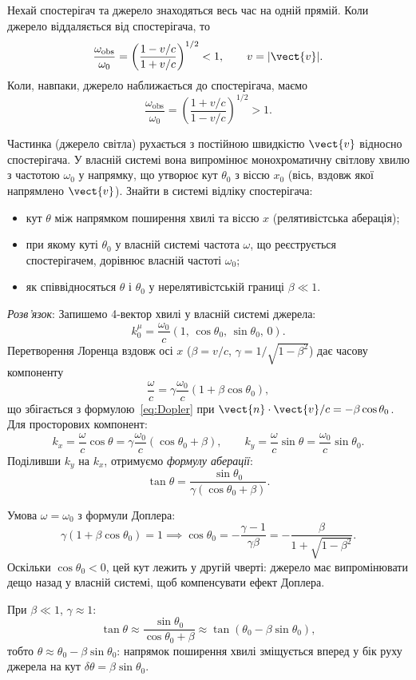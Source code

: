 Нехай спостерігач та джерело знаходяться весь час на одній прямій. Коли джерело віддаляється від спостерігача, то
\begin{equation*}
    \frac{\omega_{\text{obs}}}{\omega_0}
    = \left(\frac{1-v/c}{1+v/c}\right)^{1/2} < 1, \qquad v=|\vect{v}|.
\end{equation*}
Коли, навпаки, джерело наближається до спостерігача, маємо
\begin{equation*}
    \frac{\omega_{\text{obs}}}{\omega_0}
    = \left(\frac{1+v/c}{1-v/c}\right)^{1/2} > 1.
\end{equation*}

\begin{problem}%
    Частинка (джерело світла) рухається з постійною швидкістю $\vect{v}$ відносно спостерігача. У власній системі вона випромінює монохроматичну світлову хвилю з частотою $\omega_0$ у напрямку, що утворює кут $\theta_0$ з віссю $x_0$ (вісь, вздовж якої напрямлено $\vect{v}$).
    Знайти в системі відліку спостерігача:
    \begin{itemize}
        \item кут $\theta$ між напрямком поширення хвилі та віссю $x$ (релятивістська аберація);
        \item при якому куті $\theta_0$ у власній системі частота $\omega$, що реєструється спостерігачем, дорівнює власній частоті $\omega_0$;
        \item як співвідносяться $\theta$ і $\theta_0$ у нерелятивістській границі $\beta\ll 1$.
    \end{itemize}
    \vspace*{1ex}
    \textit{Розв'язок}: Запишемо 4-вектор хвилі у власній системі джерела:
    \[
        k_0^\mu = \frac{\omega_0}{c}\left(1,\, \cos\theta_0,\, \sin\theta_0,\, 0\right).
    \]
    Перетворення Лоренца вздовж осі $x$ ($\beta = v/c$, $\gamma = 1/\sqrt{1-\beta^2}$) дає часову компоненту
    \[
        \frac{\omega}{c} = \gamma\frac{\omega_0}{c}(1+\beta\cos\theta_0),
    \]
    що збігається з формулою~\eqref{eq:Dopler} при $\vect{n}\cdot\vect{v}/c = -\beta\cos\theta_0$. Для просторових компонент:
    \[
        k_x = \frac{\omega}{c}\cos\theta = \gamma\frac{\omega_0}{c}(\cos\theta_0+\beta), \qquad
        k_y = \frac{\omega}{c}\sin\theta = \frac{\omega_0}{c}\sin\theta_0.
    \]
    Поділивши $k_y$ на $k_x$, отримуємо \emph{формулу аберації}:
    \[
        \tan\theta = \frac{\sin\theta_0}{\gamma(\cos\theta_0+\beta)}.
    \]

    Умова $\omega = \omega_0$ з формули Доплера:
    \[
        \gamma(1+\beta\cos\theta_0) = 1 \implies \cos\theta_0 = -\frac{\gamma-1}{\gamma\beta} = -\frac{\beta}{1+\sqrt{1-\beta^2}}.
    \]
    Оскільки $\cos\theta_0 < 0$, цей кут лежить у другій чверті: джерело має випромінювати дещо назад у власній системі, щоб компенсувати ефект Доплера.

    При $\beta\ll 1$, $\gamma\approx 1$:
    \[
        \tan\theta \approx \frac{\sin\theta_0}{\cos\theta_0+\beta} \approx \tan(\theta_0 - \beta\sin\theta_0),
    \]
    тобто $\theta \approx \theta_0 - \beta\sin\theta_0$: напрямок поширення хвилі зміщується вперед у бік руху джерела на кут $\delta\theta = \beta\sin\theta_0$.
\end{problem}


